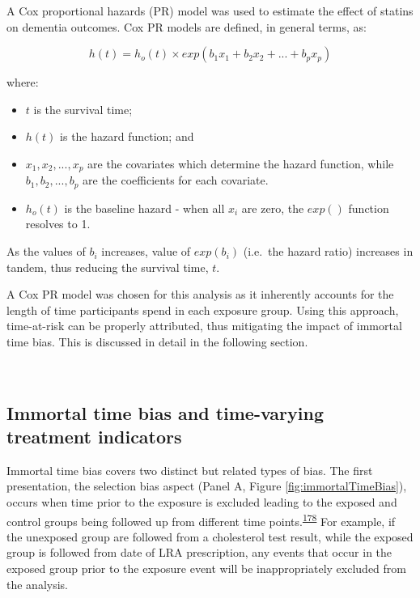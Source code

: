 \documentclass[a4paper, twoside]{templates/ociamthesis}
\providecommand{\tightlist}{%
  \setlength{\itemsep}{0pt}\setlength{\parskip}{0pt}}
\begin{document}
A Cox proportional hazards (PR) model was used to estimate the effect of statins on dementia outcomes. Cox PR models are defined, in general terms, as:

\begin{equation}
  h(t) = h_o(t) \times exp(b_1x_1 + b_2x_2 + ... +b_px_p)
  \label{eq:cox-model}
\end{equation}

where:

\begin{itemize}
\tightlist
\item
  \(t\) is the survival time;
\item
  \(h(t)\) is the hazard function; and
\item
  \(x_1,x_2,...,x_p\) are the covariates which determine the hazard function, while \(b_1,b_2,...,b_p\) are the coefficients for each covariate.
\item
  \(h_o(t)\) is the baseline hazard - when all \(x_i\) are zero, the \(exp()\) function resolves to 1.
\end{itemize}

As the values of \(b_i\) increases, value of \(exp(b_i)\) (i.e.~the hazard ratio) increases in tandem, thus reducing the survival time, \(t\).

A Cox PR model was chosen for this analysis as it inherently accounts for the length of time participants spend in each exposure group. Using this approach, time-at-risk can be properly attributed, thus mitigating the impact of immortal time bias. This is discussed in detail in the following section.

~

\hypertarget{cprd-immortal-time-bias}{%
\subsection{Immortal time bias and time-varying treatment indicators}\label{cprd-immortal-time-bias}}

Immortal time bias covers two distinct but related types of bias. The first presentation, the selection bias aspect (Panel A, Figure \ref{fig:immortalTimeBias}), occurs when time prior to the exposure is excluded leading to the exposed and control groups being followed up from different time points.\textsuperscript{\protect\hyperlink{ref-levesque2010}{178}} For example, if the unexposed group are followed from a cholesterol test result, while the exposed group is followed from date of LRA prescription, any events that occur in the exposed group prior to the exposure event will be inappropriately excluded from the analysis.
\end{document}
